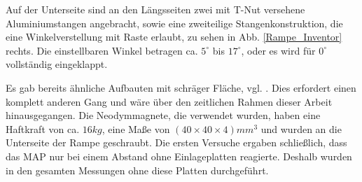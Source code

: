 Auf der Unterseite sind an den Längsseiten zwei mit T-Nut versehene Aluminiumstangen angebracht, sowie eine zweiteilige Stangenkonstruktion, die eine Winkelverstellung mit Raste erlaubt, zu sehen in Abb. \ref{Rampe_Inventor} rechts. Die einstellbaren Winkel betragen ca. $5^\circ$ bis $17^\circ$, oder es wird für $0^\circ$ vollständig eingeklappt.
  
Es gab bereits ähnliche Aufbauten mit schräger Fläche, vgl. \cite{Lutz_naowalking}. Dies erfordert einen komplett anderen Gang und wäre über den zeitlichen Rahmen dieser Arbeit hinausgegangen. Die Neodymmagnete, die verwendet wurden, haben eine Haftkraft von ca. $16 \unit{kg}$, eine Maße von $(40\times40\times4) \unit{mm^3}$ \cite{schraubmagnet} und wurden an die Unterseite der Rampe geschraubt. Die ersten Versuche ergaben schließlich, dass das MAP nur bei einem Abstand ohne Einlageplatten reagierte. Deshalb wurden in den gesamten Messungen ohne diese Platten durchgeführt. 

